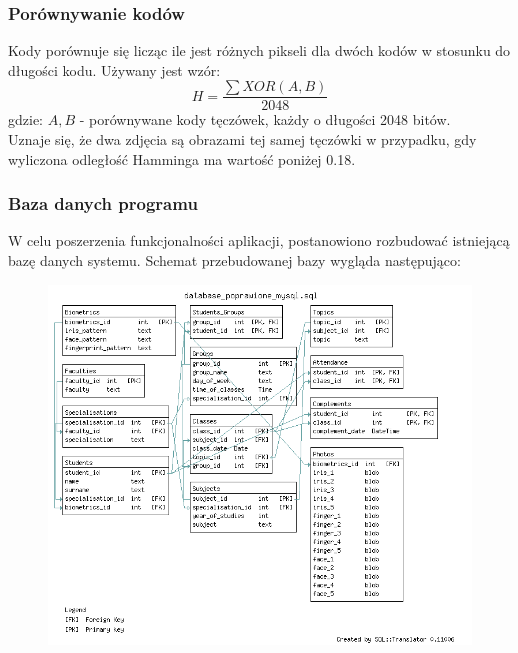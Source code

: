 \documentclass{beamer}
\begin{document}

\begin{frame}
\frametitle{Porównywanie kodów}
Kody porównuje się licząc ile jest różnych pikseli dla dwóch kodów w stosunku do długości kodu. Używany jest wzór:
$$ H = \frac{\sum XOR(A,B)}{2048} $$
gdzie:
$A, B$ - porównywane kody tęczówek, każdy o długości 2048 bitów.\\

Uznaje się, że dwa zdjęcia są obrazami tej samej tęczówki w przypadku, gdy wyliczona odległość Hamminga ma wartość poniżej 0.18.
\end{frame}

\begin{frame}
\frametitle{Baza danych programu}

W celu poszerzenia funkcjonalności aplikacji, postanowiono rozbudować istniejącą bazę danych systemu. Schemat przebudowanej bazy wygląda następująco:

\begin{figure}
\includegraphics[scale=0.3]{diag2.png}
\end{figure}
\end{frame}
\end{document}
